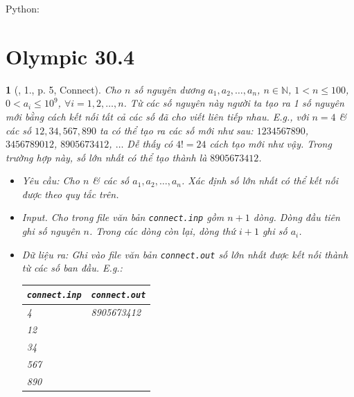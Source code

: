\documentclass{article}
\newtheorem{baitoan}{}
\begin{document}
Python:



\section{Olympic 30.4}

\begin{baitoan}[\cite{Olympic30-4_2010_Tin_Hoc}, 1., p. 5, Connect]
	Cho $n$ số nguyên dương $a_1,a_2,\ldots,a_n$, $n\in\mathbb{N}$, $1 < n\le100$, $0 < a_i\le10^9$, $\forall i = 1,2,\ldots,n$. Từ các số nguyên này người ta tạo ra 1 số nguyên mới bằng cách kết nối tất cả các số đã cho viết liên tiếp nhau. E.g., với $n = 4$ \& các số $12,34,567,890$ ta có thể tạo ra các số mới như sau: $1234567890$, $3456789012$, $8905673412$, $\ldots$ Dễ thấy có $4! = 24$ cách tạo mới như vậy. Trong trường hợp này, số lớn nhất có thể tạo thành là $8905673412$.
	\begin{itemize}
		\item {\sf Yêu cầu:} Cho $n$ \& các số $a_1,a_2,\ldots,a_n$. Xác định số lớn nhất có thể kết nối được theo quy tắc trên.
		\item {\sf Input.} Cho trong file văn bản \verb|connect.inp| gồm $n + 1$ dòng. Dòng đầu tiên ghi số nguyên $n$. Trong các dòng còn lại, dòng thứ $i + 1$ ghi số $a_i$.
		\item \emph{Dữ liệu ra:} Ghi vào file văn bản \verb|connect.out| số lớn nhất được kết nối thành từ các số ban đầu. E.g.:
		\begin{table}[H]
			\centering
			\begin{tabular}{|l|l|}
				\hline
				{\tt connect.inp} & {\tt connect.out} \\
				\hline
				4 & 8905673412 \\
				12 &  \\
				34 &  \\
				567 &  \\
				890 &  \\
				\hline
			\end{tabular}
		\end{table}
	\end{itemize}
\end{baitoan}
\end{document}
